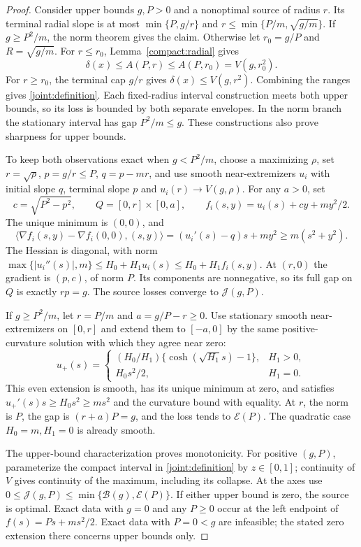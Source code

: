 \begin{proof}\label{joint:proof}
Consider upper bounds $g,P>0$ and a nonoptimal source of radius $r$.
Its terminal radial slope is at most $\min\{P,g/r\}$ and
$r\le\min\{P/m,\sqrt{g/m}\}$. If $g\ge P^2/m$, the norm theorem
gives the claim. Otherwise let $r_0=g/P$ and $R=\sqrt{g/m}$.
For $r\le r_0$, Lemma~\ref{compact:radial} gives
\[
 \delta(x)\le A(P,r)\le A(P,r_0)=V(g,r_0^2).
\]
For $r\ge r_0$, the terminal cap $g/r$ gives
$\delta(x)\le V(g,r^2)$. Combining the ranges gives
\eqref{joint:definition}. Each fixed-radius interval construction
meets both upper bounds, so its loss is bounded by both separate
envelopes. In the norm branch the stationary interval has gap
$P^2/m\le g$. These constructions also prove sharpness for upper bounds.

To keep both observations exact when $g<P^2/m$, choose a maximizing
$\rho$, set $r=\sqrt\rho$, $p=g/r\le P$, $q=p-mr$, and use smooth
near-extremizers $u_i$ with initial slope $q$, terminal slope $p$ and
$u_i(r)\to V(g,\rho)$. For any $a>0$, set
\[
 c=\sqrt{P^2-p^2},\qquad Q=[0,r]\times[0,a],\qquad
 f_i(s,y)=u_i(s)+cy+my^2/2.
\]
The unique minimum is $(0,0)$, and
\[
 \langle\nabla f_i(s,y)-\nabla f_i(0,0),(s,y)\rangle
 =(u_i'(s)-q)s+my^2\ge m(s^2+y^2).
\]
The Hessian is diagonal, with norm
$\max\{|u_i''(s)|,m\}\le H_0+H_1u_i(s)\le H_0+H_1f_i(s,y)$.
At $(r,0)$ the gradient is $(p,c)$, of norm $P$. Its components are
nonnegative, so its full gap on $Q$ is exactly $rp=g$.
The source losses converge to $\mathcal J(g,P)$.

If $g\ge P^2/m$, let $r=P/m$ and $a=g/P-r\ge0$.
Use stationary smooth near-extremizers on $[0,r]$ and extend them to
$[-a,0]$ by the same positive-curvature solution with which they agree
near zero:
\[
 u_+(s)=
 \begin{cases}
 (H_0/H_1)\{\cosh(\sqrt{H_1}s)-1\},&H_1>0,\\
 H_0s^2/2,&H_1=0.
 \end{cases}
\]
This even extension is smooth, has its unique minimum at zero, and
satisfies $u_+'(s)s\ge H_0s^2\ge ms^2$ and the curvature bound with
equality. At $r$, the norm is $P$, the gap is $(r+a)P=g$, and the
loss tends to $\mathcal E(P)$. The quadratic case $H_0=m,H_1=0$ is
already smooth.

The upper-bound characterization proves monotonicity. For positive
$(g,P)$, parameterize the compact interval in
\eqref{joint:definition} by $z\in[0,1]$; continuity of $V$ gives
continuity of the maximum, including its collapse.
At the axes use $0\le\mathcal J(g,P)\le\min\{\mathcal B(g),\mathcal E(P)\}$.
If either upper bound is zero, the source is optimal.
Exact data with $g=0$ and any $P\ge0$ occur at the left endpoint of
$f(s)=Ps+ms^2/2$. Exact data with $P=0<g$ are infeasible; the stated
zero extension there concerns upper bounds only.
\end{proof}


